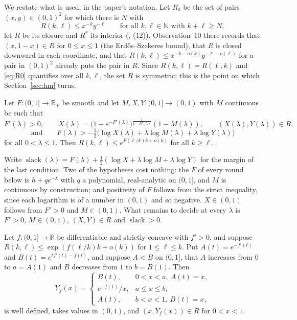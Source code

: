 \documentclass[11pt]{article}
\newcommand{\Rz}{R_0}
\newcommand{\slack}{\operatorname{slack}}
\begin{document}
We restate what is used, in the paper's notation. Let $\Rz$ be the set of pairs $(x,y)\in(0,1)^2$ for which there is $N$ with
\begin{equation}\label{eq:R0}
R(k,\ell)\le x^{-k}y^{-\ell}\qquad\text{for all }k,\ell\in\mathbb N\text{ with }k+\ell\ge N,
\end{equation}
let $R$ be its closure and $R^*$ its interior (\cite{GNNW}, (12)). Observation~10 there records that $(x,1-x)\in R$ for $0\le x\le1$ (the Erd\H{o}s--Szekeres bound), that $R$ is closed downward in each coordinate, and that $R(k,\ell)\le x^{-k-o(k)}y^{-\ell-o(\ell)}$ for a pair in $(0,1)^2$ already puts the pair in $R$. Since $R(k,\ell)=R(\ell,k)$ and \eqref{eq:R0} quantifies over all $k,\ell$, the set $R$ is symmetric; this is the point on which Section~\ref{sec:hm} turns.

\begin{theorem}\label{thm:14}
Let $F:(0,1]\to\mathbb R_+$ be smooth and let $M,X,Y:(0,1]\to(0,1)$ with $M$ continuous be such that
\[
F'(\lambda)>0,\qquad X(\lambda)=\bigl(1-e^{-F'(\lambda)}\bigr)^{\frac1{1-M(\lambda)}}(1-M(\lambda)),\qquad (X(\lambda),Y(\lambda))\in R,
\]
\[
\text{and}\qquad F(\lambda)>-\tfrac12\bigl(\log X(\lambda)+\lambda\log M(\lambda)+\lambda\log Y(\lambda)\bigr)
\]
for all $0<\lambda\le1$. Then $R(k,\ell)\le e^{F(\ell/k)k+o(k)}$ for all $k\ge\ell$.
\end{theorem}

Write $\slack(\lambda)=F(\lambda)+\tfrac12(\log X+\lambda\log M+\lambda\log Y)$ for the margin of the last condition. Two of the hypotheses cost nothing: the $F$ of every round below is $h+qe^{-\lambda}$ with $q$ a polynomial, real-analytic on $(0,1]$, and $M$ is continuous by construction; and positivity of $F$ follows from the strict inequality, since each logarithm is of a number in $(0,1)$ and so negative. $X\in(0,1)$ follows from $F'>0$ and $M\in(0,1)$. What remains to decide at every $\lambda$ is $F'>0$, $M\in(0,1)$, $(X,Y)\in R$ and $\slack>0$.

\begin{lemma}\label{lem:15}
Let $f:(0,1]\to\mathbb R$ be differentiable and strictly concave with $f'>0$, and suppose $R(k,\ell)\le\exp(f(\ell/k)k+o(k))$ for $1\le\ell\le k$. Put $A(t)=e^{-f'(t)}$ and $B(t)=e^{tf'(t)-f(t)}$, and suppose $A<B$ on $(0,1]$, that $A$ increases from $0$ to $a=A(1)$ and $B$ decreases from $1$ to $b=B(1)$. Then
\[
Y_f(x)=\begin{cases}B(t),&0<x<a,\ A(t)=x,\\ e^{-f(1)}/x,&a\le x\le b,\\ A(t),&b<x<1,\ B(t)=x,\end{cases}
\]
is well defined, takes values in $(0,1)$, and $(x,Y_f(x))\in R$ for $0<x<1$.
\end{lemma}
\end{document}
